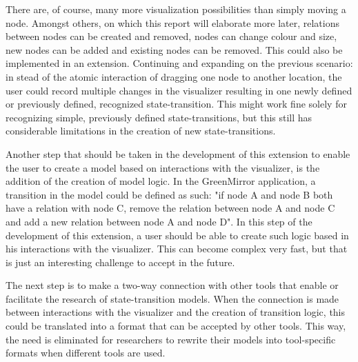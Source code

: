 \documentclass[a4paper]{article}
\begin{document}
	There are, of course, many more visualization possibilities than simply moving a node. Amongst others, on which this report will elaborate more later, relations between nodes can be created and removed, nodes can change colour and size, new nodes can be added and existing nodes can be removed. This could also be implemented in an extension. Continuing and expanding on the previous scenario: in stead of the atomic interaction of dragging one node to another location, the user could record multiple changes in the visualizer resulting in one newly defined or previously defined, recognized state-transition. This might work fine solely for recognizing simple, previously defined state-transitions, but this still has considerable limitations in the creation of new state-transitions.
	
	Another step that should be taken in the development of this extension to enable the user to create a model based on interactions with the visualizer, is the addition of the creation of model logic. In the GreenMirror application, a transition in the model could be defined as such: "if node A and node B both have a relation with node C, remove the relation between node A and node C and add a new relation between node A and node D". In this step of the development of this extension, a user should be able to create such logic based in his interactions with the visualizer. This can become complex very fast, but that is just an interesting challenge to accept in the future.
	
	The next step is to make a two-way connection with other tools that enable or facilitate the research of state-transition models. When the connection is made between interactions with the visualizer and the creation of transition logic, this could be translated into a format that can be accepted by other tools. This way, the need is eliminated for researchers to rewrite their models into tool-specific formats when different tools are used.
	
	
\end{document}
